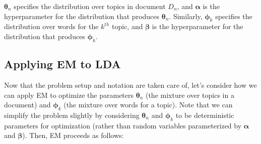 $\boldsymbol{\theta}_n$ specifies the distribution over topics in document $D_n$, and $\boldsymbol{\alpha}$ is the hyperparameter for the distribution that produces $\boldsymbol{\theta}_n$. Similarly, $\boldsymbol{\phi}_k$ specifies the distribution over words for the $k^{th}$ topic, and $\boldsymbol{\beta}$ is the hyperparameter for the distribution that produces $\boldsymbol{\phi}_k$.

\subsection{Applying EM to LDA}
Now that the problem setup and notation are taken care of, let's consider how we can apply EM to optimize the parameters $\boldsymbol{\theta}_n$ (the mixture over topics in a document) and $\boldsymbol{\phi}_k$ (the mixture over words for a topic). Note that we can simplify the problem slightly by considering $\boldsymbol{\theta}_n$ and $\boldsymbol{\phi}_k$ to be deterministic parameters for optimization (rather than random variables parameterized by $\boldsymbol{\alpha}$ and $\boldsymbol{\beta}$). Then, EM proceeds as follows:

